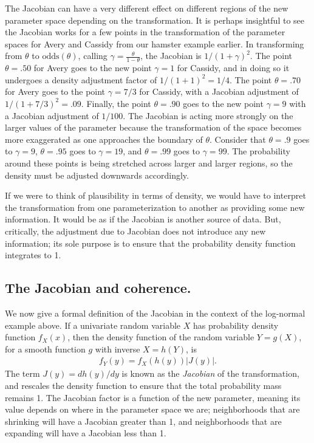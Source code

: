 \documentclass[man]{apa}
\newcommand{\oddss}{\text{odds}}
\newcommand{\blu}[1]{{#1}}
\begin{document}
The Jacobian can have a very different effect on different regions of the new parameter space depending on the transformation. It is perhaps insightful to see the Jacobian works for a few points in the transformation of the parameter spaces for Avery and Cassidy from our hamster example earlier. In transforming from $\theta$ to $\oddss(\theta)$, calling $\gamma=\frac{\theta}{1-\theta}$, the Jacobian is $1/(1+\gamma)^2$. The point $\theta=.50$ for Avery goes to the new point $\gamma=1$ for Cassidy, and in doing so it undergoes a density adjustment factor of $1/(1+1)^2 = 1/4$. The point $\theta=.70$ for Avery goes to the point $\gamma=7/3$ for Cassidy, with a Jacobian adjustment of $1/(1+7/3)^2=.09$. Finally, the point $\theta=.90$ goes to the new point $\gamma=9$ with a Jacobian adjustment of $1/100$. %
The Jacobian is acting more strongly on the larger values of the parameter because the transformation of the space becomes more exaggerated as one approaches the boundary of $\theta$. Consider that $\theta=.9$ goes to $\gamma=9$, $\theta=.95$ goes to $\gamma=19$, and $\theta=.99$ goes to $\gamma=99$. The probability around these points is being stretched across larger and larger regions, so the density must be adjusted downwards accordingly. 

If we were to think of plausibility in terms of density, we would have to interpret the transformation from one parameterization to another as providing some new information. It would be as if the Jacobian is another source of data. But, critically, the adjustment due to Jacobian does not introduce any new information; its sole purpose is to ensure that the probability density function integrates to 1. 

\subsection{The Jacobian and coherence.} We now give a formal definition of the Jacobian in the context of the log-normal example above. If a univariate random variable $X$ has probability density function $f_X(x)$, then the density function of the random variable $Y=g(X)$, for a smooth function $g$ with inverse $X = h(Y)$, is 
\begin{eqnarray}\label{eq:jacobian}
f_Y(y) = f_X(h(y))  \left|J(y)\right|.
\end{eqnarray}
The term $J(y) = dh(y)/dy$ is known as the \blu{\textit{Jacobian}} of the transformation, and rescales the density function to ensure that the total probability mass remains 1. The Jacobian factor is a function of the new parameter, meaning its value depends on where in the parameter space we are; neighborhoods that are shrinking will have a Jacobian greater than 1, and neighborhoods that are expanding will have a Jacobian less than 1.
\end{document}
